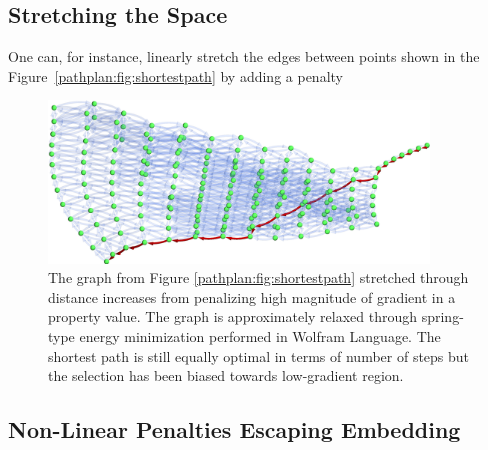 \citet{Tandoc2023MiningAlloys}

\subsection{Stretching the Space} \label{pathplan:ssec:gradientstretch}

One can, for instance, linearly stretch the edges between points shown in the Figure~\ref{pathplan:fig:shortestpath} by adding a penalty 

\begin{figure}[H]
    \centering
    \includegraphics[width=0.9\textwidth]{pathplanning/InfeasibilityGliding_LowGradient.png}
    \caption{The graph from Figure \ref{pathplan:fig:shortestpath} stretched through distance increases from penalizing high magnitude of gradient in a property value. The graph is approximately relaxed through spring-type energy minimization performed in Wolfram Language. The shortest path is still equally optimal in terms of number of steps but the selection has been biased towards low-gradient region.}
    \label{pathplan:fig:lowgradient}
\end{figure}

\subsection{Non-Linear Penalties Escaping Embedding} \label{pathplan:ssec:gradientsquare}

\todo

